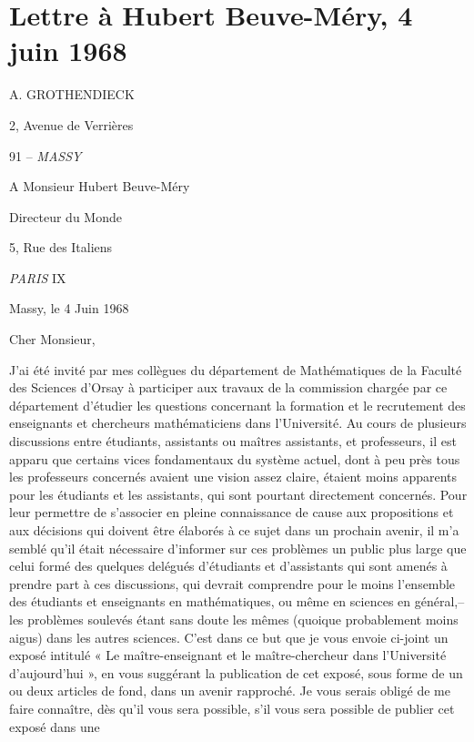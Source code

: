 \documentclass[11pt,a4paper]{article}
\begin{document}

\section*{Lettre à Hubert Beuve-Méry, 4 juin 1968}

A. GROTHENDIECK

2, Avenue de Verrières

91 -- \emph{MASSY}

A Monsieur Hubert Beuve-Méry

Directeur du Monde

5, Rue des Italiens

\emph{PARIS} IX

Massy, le 4 Juin 1968

Cher Monsieur,

J'ai été invité par mes collègues du département de Mathématiques
de la Faculté des Sciences d'Orsay à participer aux travaux de la commission
chargée par ce département d'étudier les questions concernant la formation
et le recrutement des enseignants et chercheurs mathématiciens dans
l'Université. Au cours de plusieurs discussions entre étudiants, assistants ou
maîtres assistants, et professeurs, il est apparu que certains vices
fondamentaux du système actuel, dont à peu près tous les professeurs concernés
avaient une vision assez claire, étaient moins apparents pour les étudiants
et les assistants, qui sont pourtant directement concernés. Pour leur
permettre de s'associer en pleine connaissance de cause aux propositions et aux
décisions qui doivent être élaborés à ce sujet dans un prochain avenir, il
m'a semblé qu'il était nécessaire d'informer sur ces problèmes un public
plus large que celui formé des quelques delégués d'étudiants et d'assistants
qui sont amenés à prendre part à ces discussions, qui devrait comprendre pour
le moins l'ensemble des étudiants et enseignants en mathématiques, ou même
en sciences en général,-- les problèmes soulevés étant sans doute les mêmes
(quoique probablement moins aigus) dans les autres sciences. C'est dans ce
but que je vous envoie ci-joint un exposé intitulé « Le maître-enseignant et
le maître-chercheur dans l'Université d'aujourd'hui », en vous suggérant la
publication de cet exposé, sous forme de un ou deux articles de fond, dans
un avenir rapproché. Je vous serais obligé de me faire connaître, dès qu'il
vous sera possible, s'il vous sera possible de publier cet exposé dans une
\end{document}
